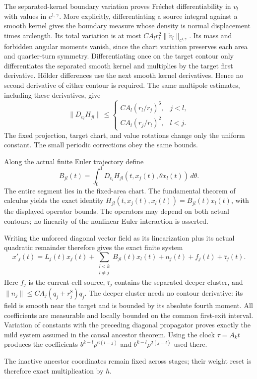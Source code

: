 \documentclass[11pt]{amsart}
\theoremstyle{remark}
\numberwithin{equation}{section}
\begin{document}
The separated-kernel boundary variation proves Fr\'echet differentiability
in $v_l$ with values in $c^{1,\gamma}$. More explicitly, differentiating a
source integral against a smooth kernel gives the boundary measure whose
density is normal displacement times arclength. Its total variation is at
most $CA_lr_l^2\|\dot v_l\|_{c^{1,\gamma}}$. Its mass and forbidden
angular moments vanish, since the chart variation preserves each area
and quarter-turn symmetry. Differentiating once on the target contour
only differentiates the separated smooth kernel and multiplies by the
target first derivative. H\"older differences use the next smooth kernel
derivatives. Hence no second derivative of either contour is required.
The same multipole estimates, including these derivatives, give
\[
 \|D_{v_l}H_{jl}\|\le
 \begin{cases}
  CA_l(r_l/r_j)^6,&j<l,\\
  CA_l(r_j/r_l)^2,&l<j.
 \end{cases}
\]
The fixed projection, target chart, and value rotations change only the
uniform constant. The small periodic corrections obey the same bounds.

Along the actual finite Euler trajectory define
\[
 B_{jl}(t)=\int_0^1
 D_{v_l}H_{jl}(t,x_j(t),\theta x_l(t))\,d\theta.
\]
The entire segment lies in the fixed-area chart. The fundamental theorem
of calculus yields the exact identity
$H_{jl}(t,x_j(t),x_l(t))=B_{jl}(t)x_l(t)$, with the displayed operator
bounds. The operators may depend on both actual contours; no linearity
of the nonlinear Euler interaction is asserted.

Writing the unforced diagonal vector field as its linearization plus its
actual quadratic remainder therefore gives the exact finite system
\[
 x'_j(t)=L_j(t)x_j(t)+\sum_{\substack{l<k\\l\ne j}}
 B_{jl}(t)x_l(t)+n_j(t)+f_j(t)+\mathfrak r_j(t).
\]
Here $f_j$ is the current-cell source, $\mathfrak r_j$ contains the separated deeper
cluster, and
$\|n_j\|\le CA_j(q_j+r_j^8)q_j$. The deeper cluster needs no contour
derivative: its field is smooth near the target and is bounded by its
absolute fourth moment. All coefficients are measurable and locally
bounded on the common first-exit interval. Variation of constants with
the preceding diagonal propagator proves exactly the mild system assumed
in the causal ancestor theorem. Using the clock $\tau=A_kt$ produces the
coefficients $b^{k-l}\rho^{6(l-j)}$ and
$b^{k-l}\rho^{2(j-l)}$ used there.

The inactive ancestor coordinates remain fixed across stages; their
weight reset is therefore exact multiplication by $h$.
\end{document}
